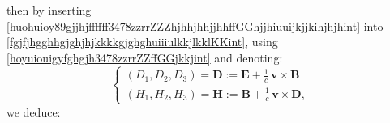\documentclass{article}
\theoremstyle{definition}
\theoremstyle{remark}
\renewcommand{\vec}[1]{\mathbf{#1}}
\newcommand{\er}{\eqref}
\newcommand{\er}{\eqref}
\begin{document}
then by inserting
\er{huohuioy89gjjhjffffff3478zzrrZZZhjhhjhhjjhhffGGhjjhiuuijkjjkihjhjhint}
into \er{fgjfjhgghhgjghjhjkkkkgjghghuiiiulkkjlkklKKint}, using
\er{hoyuiouigyfghgjh3478zzrrZZffGGjkkjint} and denoting:
\begin{equation}\label{MaxVacFullPPNhjjghint}
\begin{cases}
(D_1,D_2,D_3)=\vec D:=\vec E+\frac{1}{c}\,\vec v\times
\vec B\\
(H_1,H_2,H_3)=\vec H:=\vec B+\frac{1}{c}\,\vec v\times \vec D,
\end{cases}
\end{equation}
we deduce:
%
%
%
\begin{comment}
\begin{equation}\label{khjhhkfgjfjhgghhgjghjhjkkkkgjghghuiiiulkkjlkklKKgfgjhjjghgjhhjhjhhhhhint}
\begin{cases}
F^{00}=0
\\
F^{jj}=0 \quad\forall\, j=1,2,3,
\\
F^{01}=-F^{10}=-F_{01}+\frac{v_2}{c}F_{12}+\frac{v_3}{c}F_{13}=-\left(E_1+\frac{1}{c}\left(v_2B_3-v_3B_2\right)\right)\\
F^{02}=-F^{20}=-F_{02}+\frac{v_1}{c}F_{21}+\frac{v_3}{c}F_{23}=-\left(E_2+\frac{1}{c}\left(v_3B_1-v_1B_3\right)\right)\\
F^{03}=-F^{30}=-F_{03}+\frac{v_1}{c}F_{31}+\frac{v_2}{c}F_{32}=-\left(E_3+\frac{1}{c}\left(v_1B_2-v_2B_1\right)\right)
\\


\end{comment}
\end{document}
